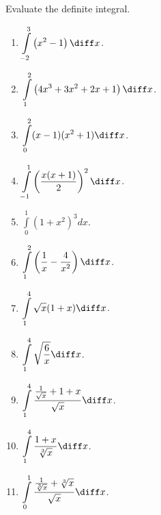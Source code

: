 Evaluate the definite integral.
\begin{multicols}{3}
\begin{enumerate}
\item $\displaystyle \int\limits_{-2}^{3} \left(x^2-1 \right)  \diff x$.


\item $\displaystyle \int\limits_{1}^{2} \left(4x^3+3x^2+2x+1\right)  \diff x$.

\item $\displaystyle \int\limits_{0}^{2}(x-1)(x^2+1)  \diff x$.

\item $\displaystyle \int\limits_{-1}^{1} \left( \frac{x(x+1) }{ 2} \right)^2  \diff x$.

\item $\displaystyle \int\limits_{0}^{1}(1+x^2)^3 dx$.

\item $\displaystyle \int \limits_{1}^{2} \left(\frac{1}{x} - \frac{4}{x^2} \right)  \diff x$.

\item $\displaystyle \int\limits_{1}^{4}\sqrt{x}(1+x) \diff x$.

\item $\displaystyle \int\limits_{1}^{4}\sqrt{\frac{6}{x}} \diff x$.

\answer{$\left[ \right]_{}^{}=$}
\item $\displaystyle \int \limits_{1}^{4} \frac{\frac{1}{\sqrt{x}}+1+x}{ \sqrt{x}}  \diff x$.

\answer{$\left[ \right]_{}^{}=$}
\item $\displaystyle \int \limits_{1}^{4} \frac{1+x}{ \sqrt[3]{x}} \diff x$.

\answer{$\left[ \right]_{}^{}=$}
\item $\displaystyle \int\limits_{0}^1 \frac{\frac{1}{\sqrt[3]{x}}+\sqrt[3]{x}}{ \sqrt{x}}\diff x$.


\end{enumerate}
\end{multicols}
